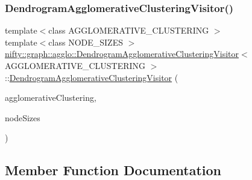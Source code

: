 \subsubsection{\texorpdfstring{Dendrogram\+Agglomerative\+Clustering\+Visitor()}{DendrogramAgglomerativeClusteringVisitor()}\hspace{0.1cm}{\footnotesize\ttfamily [2/2]}}
{\footnotesize\ttfamily template$<$class A\+G\+G\+L\+O\+M\+E\+R\+A\+T\+I\+V\+E\+\_\+\+C\+L\+U\+S\+T\+E\+R\+I\+NG $>$ \\
template$<$class N\+O\+D\+E\+\_\+\+S\+I\+Z\+ES $>$ \\
\hyperlink{classnifty_1_1graph_1_1agglo_1_1DendrogramAgglomerativeClusteringVisitor}{nifty\+::graph\+::agglo\+::\+Dendrogram\+Agglomerative\+Clustering\+Visitor}$<$ A\+G\+G\+L\+O\+M\+E\+R\+A\+T\+I\+V\+E\+\_\+\+C\+L\+U\+S\+T\+E\+R\+I\+NG $>$\+::\hyperlink{classnifty_1_1graph_1_1agglo_1_1DendrogramAgglomerativeClusteringVisitor}{Dendrogram\+Agglomerative\+Clustering\+Visitor} (\begin{DoxyParamCaption}\item[{const \hyperlink{classnifty_1_1graph_1_1agglo_1_1DendrogramAgglomerativeClusteringVisitor_a78a8c905d28562d120d4827cbfbc57bc}{Agglomerative\+Clustering\+Type} \&}]{agglomerative\+Clustering,  }\item[{N\+O\+D\+E\+\_\+\+S\+I\+Z\+ES \&}]{node\+Sizes }\end{DoxyParamCaption})\hspace{0.3cm}{\ttfamily [inline]}}



\subsection{Member Function Documentation}
\mbox{\label{classnifty_1_1graph_1_1agglo_1_1DendrogramAgglomerativeClusteringVisitor_a0abd59925ced8e1147fd8554613dfab2}} 

